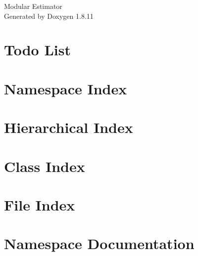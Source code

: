 \documentclass[twoside]{book}
\newcommand{\+}{\discretionary{\mbox{\scriptsize$\hookleftarrow$}}{}{}}
\newcommand{\clearemptydoublepage}{%
  \newpage{\pagestyle{empty}\cleardoublepage}%
}
\begin{document}
\hypersetup{pageanchor=false,
             bookmarksnumbered=true,
             pdfencoding=unicode
            }
\begin{titlepage}
\vspace*{7cm}
\begin{center}%
{\Large Modular Estimator }\\
\vspace*{1cm}
{\large Generated by Doxygen 1.8.11}\\
\end{center}
\end{titlepage}
\clearemptydoublepage
\tableofcontents
\clearemptydoublepage
{}
\hypersetup{pageanchor=true}

\chapter{Todo List}
\label{todo}
\hypertarget{todo}{}

\chapter{Namespace Index}

\chapter{Hierarchical Index}

\chapter{Class Index}

\chapter{File Index}

\chapter{Namespace Documentation}












\end{document}
